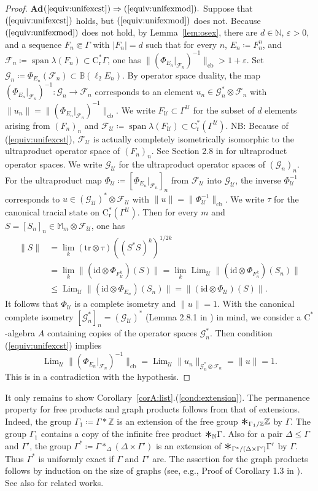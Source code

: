 \documentclass[12pt,nosumlimits,nonamelimits]{amsart}
\theoremstyle{remark}
\theoremstyle{definition}
\newcommand{\IB}{\mathbb{B}}
\newcommand{\IM}{\mathbb{M}}
\newcommand{\IN}{\mathbb{N}}
\newcommand{\IZ}{\mathbb{Z}}
\newcommand{\rC}{\mathrm{C}}
\newcommand{\rr}{\mathrm{r}}
\newcommand{\cF}{\mathcal{F}}
\newcommand{\cG}{\mathcal{G}}
\newcommand{\cU}{\mathcal{U}}
\newcommand{\ve}{\varepsilon}
\newcommand{\Ga}{\Gamma}
\newcommand{\id}{\mathrm{id}}
\DeclareMathOperator{\cb}{cb}
\DeclareMathOperator{\Lim}{Lim}
\newcommand{\lspan}{\mathop{\mathrm{span}}}
\def\bigast{\font\bigsymbolsfont=cmsy10 scaled \magstep3
 \setbox0=\hbox{\bigsymbolsfont\char'003 }\mathord{\lower1pt\box0}}\relax\ignorespaces
\newcommand{\cst}{$\rC^*$-alge\-bra}
\begin{document}
\begin{proof}
\textbf{Ad}$(\ref{equiv:unifexcst})\Rightarrow(\ref{equiv:unifexmod}).$ 
Suppose that $(\ref{equiv:unifexcst})$ holds, 
but $(\ref{equiv:unifexmod})$ does not. 
Because $(\ref{equiv:unifexmod})$ does not hold, 
by Lemma~\ref{lem:osex}, 
there are $d\in\IN$, $\ve>0$, and a sequence 
$F_n\Subset\Ga$ with $|F_n|=d$ such that 
for every $n$, $E_n \coloneq F_n^n$, and 
$\cF_n\coloneq\lspan\lambda(F_n)\subset \rC^*_\rr\Ga$, 
one has $\|(\Phi_{E_n}|_{\cF_n})^{-1}\|_{\cb}>1+\ve$. 
Set $\cG_n \coloneq \Phi_{E_n}(\cF_n) \subset \IB(\ell_2E_n)$. 
By operator space duality, the map 
$(\Phi_{E_n}|_{\cF_n})^{-1}\colon\cG_n\to\cF_n$ 
corresponds to an element $u_n\in \cG_n^*\otimes\cF_n$ 
with $\|u_n\| = \|(\Phi_{E_n}|_{\cF_n})^{-1}\|_{\cb}$. 
We write $F_\cU\subset\Ga^\cU$ for the subset of $d$ elements 
arising from $(F_n)_n$ and 
$\cF_\cU \coloneq \lspan\lambda(F_\cU) 
 \subset \rC^*_\rr(\Ga^\cU)$.
NB: Because of (\ref{equiv:unifexcst}), $\cF_\cU$ is actually 
completely isometrically isomorphic to the ultraproduct operator 
space of $(F_n)_n$. 
See Section 2.8 in \cite{pisier} for ultraproduct operator spaces. 
We write $\cG_\cU$ for the ultraproduct operator spaces 
of $(\cG_n)_n$. 
For the ultraproduct map
$\Phi_\cU\coloneq [\Phi_{E_n}|_{\cF_n}]_n$ from $\cF_\cU$ 
into $\cG_\cU$, the inverse $\Phi_\cU^{-1}$ corresponds 
to $u \in (\cG_\cU)^*\otimes \cF_\cU$ with 
$\|u\| = \| \Phi_\cU^{-1}\|_{\cb}$. 
We write $\tau$ for the canonical tracial state on $\rC^*_\rr(\Ga^\cU)$. 
Then for every $m$ and $S = [S_n]_n \in \IM_m\otimes\cF_\cU$, 
one has 
\begin{align*}
\| S \| &= \lim_k (\mathrm{tr}\otimes\tau)((S^*S)^k)^{1/2k}\\
 &= \lim_k \|(\id\otimes\Phi_{F_\cU^k})(S) \| 
  = \lim_k\Lim_\cU \|(\id\otimes\Phi_{F_n^k})(S_n) \| \\
 &\le \Lim_\cU \|(\id\otimes\Phi_{E_n})(S_n) \| 
  = \|(\id\otimes\Phi_\cU)(S) \|. 
\end{align*}
It follows that $\Phi_\cU$ is a complete isometry and 
$\|u\|=1$. 
With the canonical complete isometry 
$[\cG_n^*]_n = (\cG_\cU)^*$  
(Lemma 2.8.1 in \cite{pisier}) in mind, 
we consider a \cst{} $A$ containing 
copies of the operator spaces $\cG_n^*$. 
Then condition (\ref{equiv:unifexcst}) implies
\[
\Lim_\cU\| (\Phi_{E_n}|_{\cF_n})^{-1}\|_{\cb} 
 = \Lim_\cU \| u_n \|_{\cG_n^*\otimes\cF_n}
 = \| u \| = 1.
\]
This is in a contradiction with the hypothesis.
\end{proof}

It only remains to show Corollary~\ref{corA:list}.(\ref{cond:extension}). 
The permanence property for 
free products and graph products follows from that of extensions. 
Indeed, 
the group $\Ga_1 \coloneq \Ga*\IZ$ 
is an extension of the free group 
$\bigast_{\Ga_1/\IZ} \IZ$ by $\Ga$. 
The group $\Ga_1$ contains a copy of the infinite free product $\bigast_\IN\Ga$.
Also for a pair $\Delta\le\Ga$ and $\Ga'$, the group 
$\Ga^* \coloneq \Ga*_\Delta(\Delta\times\Ga')$ 
is an extension of 
$\bigast_{\Ga^*/(\Delta\times\Ga')} \Ga'$ by $\Ga$. 
Thus $\Ga^*$ is uniformly exact if $\Ga$ and $\Ga'$ are. 
The assertion for the graph products follows by induction 
on the size of graphs (see, e.g., Proof of Corollary 1.3 in \cite{gkmp}). 
See also \cite{lm} for related works. 
\end{document}
